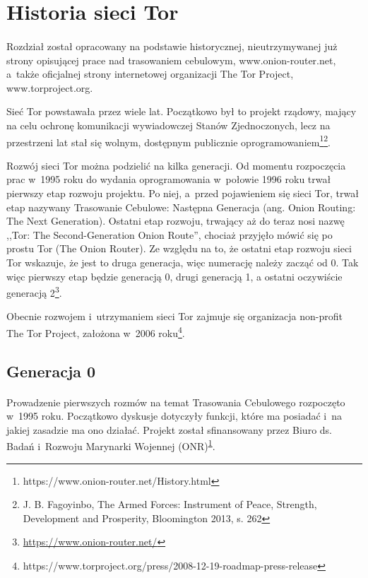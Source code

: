 \section{Historia sieci Tor}\paragraph{}
Rozdział został opracowany na podstawie historycznej, nieutrzymywanej już strony opisującej prace nad trasowaniem cebulowym, www.onion-router.net, a~także oficjalnej strony internetowej organizacji The Tor Project, www.torproject.org.

Sieć Tor powstawała przez wiele lat. Początkowo był to projekt rządowy, mający na celu ochronę komunikacji wywiadowczej Stanów Zjednoczonych, lecz na przestrzeni lat stał się wolnym, dostępnym publicznie oprogramowaniem\footnote{https://www.onion-router.net/History.html\label{hist}}\footnote{J. B. Fagoyinbo, The Armed Forces: Instrument of Peace, Strength, Development and Prosperity, Bloomington 2013, s. 262}. 

Rozwój sieci Tor można podzielić na kilka generacji. Od momentu rozpoczęcia prac w~1995 roku do wydania oprogramowania w~połowie 1996 roku trwał pierwszy etap rozwoju projektu. Po niej, a~przed pojawieniem się sieci Tor, trwał etap nazywany Trasowanie Cebulowe: Następna Generacja (ang. Onion Routing: The Next Generation). Ostatni etap rozwoju, trwający aż do teraz nosi nazwę ,,Tor: The Second-Generation Onion Route'', chociaż przyjęło mówić się po prostu Tor (The Onion Router). Ze względu na to, że ostatni etap rozwoju sieci Tor wskazuje, że jest to druga generacja, więc numerację należy zacząć od 0. Tak więc pierwszy etap będzie generacją 0, drugi generacją 1, a ostatni oczywiście generacją 2\footnote{\url{https://www.onion-router.net/}\label{onionrouter}}.

Obecnie rozwojem i~utrzymaniem sieci Tor zajmuje się organizacja non-profit The Tor Project, założona w~2006 roku\footnote{https://www.torproject.org/press/2008-12-19-roadmap-press-release}.

\subsection{Generacja 0}\paragraph{}
Prowadzenie pierwszych rozmów na temat Trasowania Cebulowego rozpoczęto w~1995 roku. Początkowo dyskusje dotyczyły funkcji, które ma posiadać i~na jakiej zasadzie ma ono działać. Projekt został sfinansowany przez Biuro ds. Badań i~Rozwoju Marynarki Wojennej (ONR)\textsuperscript{\ref{hist}}.

